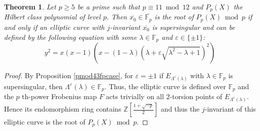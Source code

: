 \documentclass[a4paper, 11pt]{article}
\theoremstyle{plain}
\newtheorem{thm}[defn]{Theorem}
\newcommand{\?}{\textcolor{red}{??}}
\newcommand{\lm}{\lambda}
\newcommand{\Lm}{\Lambda}
\newcommand{\fp}{\mathbb{F}_p}
\newcommand{\bZ}{\mathbb{Z}}
\begin{document}
\begin{thm}
\label{important2}
    Let $p\ge 5$ be a prime such that $p \equiv 11 \bmod 12$ and $P_{p}(X)$ the Hilbert class polynomial of level $p$. Then $\overline{x_0} \in \overline{\fp}$ is the root of $P_{p}(X) \bmod p$ if and only if an elliptic curve with $j$-invariant $\overline{x_0}$ is supersingular and can be defined by the following equation with some $\lm\in\fp$ and $\varepsilon \in \{\pm1\}$:
    \[
    y^2=x(x-1)(x-(1-\lm)(\lm+\varepsilon\sqrt{\lm^2-\lm+1})^2)
    \] 
\end{thm}
\begin{proof}
    By Proposition \ref{pmod43fpcase}, for $\varepsilon=\pm1$ if $E_{\Lm^{\varepsilon}(\lm)}$ with $\lm \in \fp$ is supersingular, then $\Lm^{\varepsilon}(\lm)\in \fp$. Thus, the elliptic curve is defined over $\fp$ and the $p$ th-power Frobenius map $F$ acts trivially on all $2$-torsion points of $E_{\Lm^{\varepsilon}(\lm)}$. Hence its endomorphism ring contains $\bZ\left [\frac{1+\sqrt{-p}}{2}  \right]$ and thus the $j$-invariant of this elliptic curve is the root of $P_p(X) \bmod p$.


\end{proof}
\end{document}
